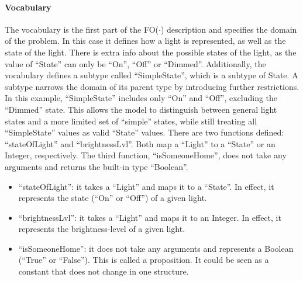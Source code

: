 \documentclass[11pt,a4paper]{report}
\newcommand{\fodot}{FO($\cdot$)\xspace}
\begin{document}
\paragraph{Vocabulary}
The vocabulary is the first part of the \fodot description and specifies the domain of the problem. In this case it defines how a light is represented, as well as the state of the light. There is extra info about the possible states of the light, as the value of ``State'' can only be ``On'', ``Off'' or ``Dimmed''. Additionally, the vocabulary defines a subtype called ``SimpleState'', which is a subtype of State. A subtype narrows the domain of its parent type by introducing further restrictions. In this example, ``SimpleState'' includes only ``On'' and ``Off'', excluding the ``Dimmed'' state. This allows the model to distinguish between general light states and a more limited set of ``simple'' states, while still treating all ``SimpleState'' values as valid ``State'' values. There are two functions defined: ``stateOfLight'' and ``brightnessLvl''. Both map a ``Light'' to a ``State'' or an Integer, respectively. The third function, ``isSomeoneHome'', does not take any arguments and returns the built-in type ``Boolean''.
\begin{itemize}
    \item ``stateOfLight'': it takes a ``Light'' and maps it to a ``State''. In effect, it represents the state (``On'' or ``Off'') of a given light.
    \item ``brightnessLvl'': it takes a ``Light'' and maps it to an Integer. In effect, it represents the brightness-level of a given light.
    \item ``isSomeoneHome'': it does not take any arguments and represents a Boolean (``True'' or ``False''). This is called a proposition. It could be seen as a constant that does not change in one structure.
\end{itemize}
\end{document}
